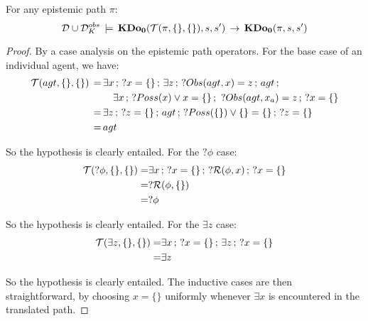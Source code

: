 \begin{lemma}
\label{lem:KDoZ_E1_impl_KDoZ}For any epistemic path $\pi$:\[
\mathcal{D}\cup\mathcal{D}_{K}^{obs}\,\models\,\mathbf{KDo_{0}}(\mathcal{T}(\pi,\{\},\{\}),s,s')\,\rightarrow\,\mathbf{KDo_{0}}(\pi,s,s')\]

\end{lemma}
\begin{proof}
By a case analysis on the epistemic path operators. For the base case
of an individual agent, we have:\begin{align*}
\mathcal{T}(agt,\{\},\{\})\,=\, & \exists x\,;\,?x=\{\}\,;\,\exists z\,;\,?Obs(agt,x)=z\,;\, agt\,;\\
 & \,\,\,\,\,\,\exists x\,;\,?Poss(x)\vee x=\{\}\,;\,\,?Obs(agt,x_{a})=z\,;\,?x=\{\}\\
=\, & \exists z\,;\,?z=\{\}\,;\, agt\,;\,?Poss(\{\})\vee\{\}=\{\}\,;\,?z=\{\}\\
=\, & agt\end{align*}


So the hypothesis is clearly entailed. For the $?\phi$ case:\begin{align*}
\mathcal{T}(?\phi,\{\},\{\})= & \exists x\,;\,?x=\{\}\,;\,?\mathcal{R}(\phi,x)\,;\,?x=\{\}\\
= & ?\mathcal{R}(\phi,\{\})\\
= & ?\phi\end{align*}


So the hypothesis is clearly entailed. For the $\exists z$ case:\begin{align*}
\mathcal{T}(\exists z,\{\},\{\})= & \exists x\,;\,?x=\{\}\,;\,\exists z\,;\,?x=\{\}\\
= & \exists z\end{align*}


So the hypothesis is clearly entailed. The inductive cases are then
straightforward, by choosing $x=\{\}$ uniformly whenever $\exists x$
is encountered in the translated path.
\end{proof}
\medskip{}
\newpage{}

